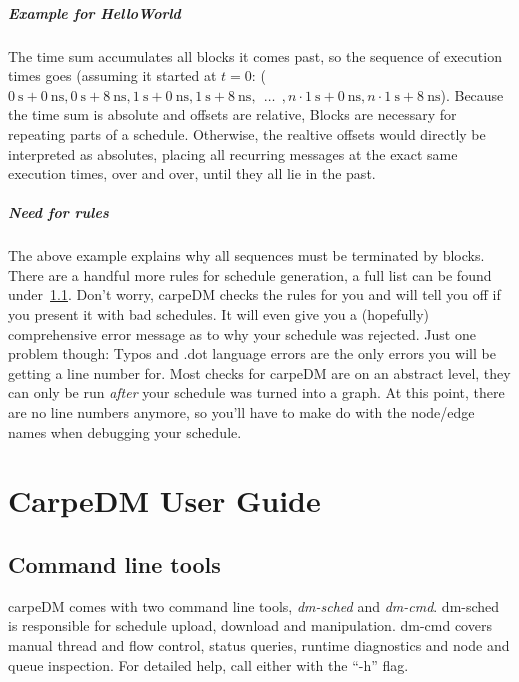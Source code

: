 \paragraph{Example for HelloWorld}
The time sum accumulates all blocks it comes past, so the sequence of execution times goes (assuming it started at $t=0$:
\newline
($\SI{0}{\second} + \SI{0}{\nano\second}, \SI{0}{\second} + \SI{8}{\nano\second}, \SI{1}{\second} + \SI{0}{\nano\second}, \SI{1}{\second} + \SI{8}{\nano\second}, ~~\dots~~ , n \cdot \SI{1}{\second} + \SI{0}{\nano\second}, n \cdot \SI{1}{\second} + \SI{8}{\nano\second}$). Because the time sum is absolute and offsets are relative, Blocks are necessary for repeating parts of a schedule.
Otherwise, the realtive offsets would directly be interpreted as absolutes, placing all recurring messages at the exact same execution times, over and over, until they all lie in the past.
\paragraph{Need for rules}
The above example explains why all sequences must be terminated by blocks. There are a handful more rules for schedule generation, a full list can be found under~\ref{}.
Don't worry, carpeDM checks the rules for you and will tell you off if you present it with bad schedules. It will even give you a (hopefully) comprehensive error message as to why your schedule was rejected.
Just one problem though: Typos and .dot language errors are the only errors you will be getting a line number for. Most checks for carpeDM are on an abstract level, they can only be run \emph{after} your schedule was turned into a graph.
At this point, there are no line numbers anymore, so you'll have to make do with the node/edge names when debugging your schedule.



\chapter{CarpeDM User Guide}

\section{Command line tools}

carpeDM comes with two command line tools, \emph{dm-sched} and \emph{dm-cmd}. dm-sched is responsible for schedule upload, download and manipulation. dm-cmd covers manual thread and flow control, status queries, runtime diagnostics and node and queue inspection. For detailed help, call either with the \enquote{-h} flag.

